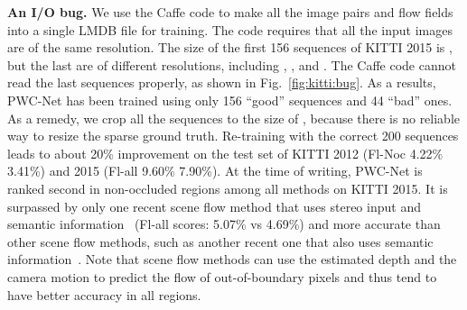 \documentclass[10pt,journal,cspaper,compsoc]{IEEEtran}
\begin{document}
	\textbf{An I/O bug.} We use the Caffe code\cite{Dosovitskiy:2015Flownet} to make all the image pairs and flow fields into a single LMDB file for training. The code requires that all the input images are of the same resolution. The size of the first 156 sequences of KITTI 2015 is , but the last  are of different resolutions, including , , and . The Caffe code cannot read the last  sequences properly, as shown in Fig.~\ref{fig:kitti:bug}. As a results, PWC-Net has been trained using only 156 ``good'' sequences and 44 ``bad'' ones. As a remedy, we crop all the sequences to the size of , because there is no reliable way to resize the sparse ground truth. Re-training with the correct 200 sequences leads to about 20\% improvement on the test set of KITTI 2012 (Fl-Noc 4.22\%  3.41\%) and 2015 (Fl-all 9.60\%   7.90\%). At the time of writing, PWC-Net is ranked second in non-occluded regions among all methods on KITTI 2015. It is surpassed by only one recent scene flow method that uses stereo input and semantic information~\cite{Behl2017ICCV} (Fl-all scores: 5.07\% vs 4.69\%) and more accurate than other scene flow methods, such as another recent one that also uses semantic information~\cite{ren2017cascaded}. Note that scene flow methods can use the estimated depth and the camera motion to predict the flow of out-of-boundary pixels and thus tend to have better accuracy in all regions.
	 

	
	
\end{document}
